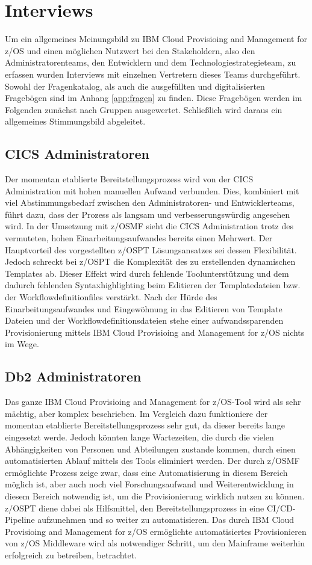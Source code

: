\section{Interviews}
Um ein allgemeines Meinungsbild zu \glqq IBM Cloud Provisioing and Management for z/OS\grqq{} und einen möglichen Nutzwert bei den Stakeholdern, also den Administratorenteams, den Entwicklern und dem Technologiestrategieteam, zu erfassen wurden Interviews mit einzelnen Vertretern dieses Teams durchgeführt.
Sowohl der Fragenkatalog, als auch die ausgefüllten und digitalisierten Fragebögen sind im Anhang \ref{app:fragen} zu finden.
Diese Fragebögen werden im Folgenden zunächst nach Gruppen ausgewertet.
Schließlich wird daraus ein allgemeines Stimmungsbild abgeleitet.

\subsection{CICS Administratoren}
Der momentan etablierte Bereitstellungsprozess wird von der CICS Administration mit hohen manuellen Aufwand verbunden.
Dies, kombiniert mit viel Abstimmungsbedarf zwischen den Administratoren- und Entwicklerteams, führt dazu, dass der Prozess als langsam und verbesserungswürdig angesehen wird.
In der Umsetzung mit z/OSMF sieht die CICS Administration trotz des vermuteten, hohen Einarbeitungsaufwandes bereits einen Mehrwert.
Der Hauptvorteil des vorgestellten z/OSPT Lösungsansatzes sei dessen Flexibilität.
Jedoch schreckt bei z/OSPT die Komplexität des zu erstellenden dynamischen Templates ab.
Dieser Effekt wird durch fehlende Toolunterstützung und dem dadurch fehlenden Syntaxhighlighting beim Editieren der Templatedateien bzw. der Workflowdefinitionfiles verstärkt.
Nach der Hürde des Einarbeitungsaufwandes und Eingewöhnung in das Editieren von Template Dateien und der Workflowdefinitionsdateien stehe einer aufwandssparenden Provisionierung mittels \glqq IBM Cloud Provisioing and Management for z/OS\grqq{} nichts im Wege.

\subsection{Db2 Administratoren}
Das ganze \glqq IBM Cloud Provisioing and Management for z/OS\grqq-Tool wird als sehr mächtig, aber komplex beschrieben.
Im Vergleich dazu funktioniere der momentan etablierte Bereitstellungsprozess sehr gut, da dieser bereits lange eingesetzt werde.
Jedoch könnten lange Wartezeiten, die durch die vielen Abhängigkeiten von Personen und Abteilungen zustande kommen, durch einen automatisierten Ablauf mittels des Tools eliminiert werden.
Der durch z/OSMF ermöglichte Prozess zeige zwar, dass eine Automatisierung in diesem Bereich möglich ist, aber auch noch viel Forschungsaufwand und Weiterentwicklung in diesem Bereich notwendig ist, um die Provisionierung wirklich nutzen zu können.
z/OSPT diene dabei als Hilfsmittel, den Bereitstellungsprozess in eine CI/CD-Pipeline aufzunehmen und so weiter zu automatisieren.
Das durch \glqq IBM Cloud Provisioing and Management for z/OS\grqq{} ermöglichte automatisiertes Provisionieren von z/OS Middleware wird als notwendiger Schritt, um den Mainframe weiterhin erfolgreich zu betreiben, betrachtet.

